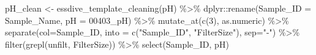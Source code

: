 \documentclass[
]{article}
\newenvironment{Shaded}{\begin{snugshade}}{\end{snugshade}}
\newcommand{\AttributeTok}[1]{\textcolor[rgb]{0.77,0.63,0.00}{#1}}
\newcommand{\DecValTok}[1]{\textcolor[rgb]{0.00,0.00,0.81}{#1}}
\newcommand{\FunctionTok}[1]{\textcolor[rgb]{0.00,0.00,0.00}{#1}}
\newcommand{\NormalTok}[1]{#1}
\newcommand{\OtherTok}[1]{\textcolor[rgb]{0.56,0.35,0.01}{#1}}
\newcommand{\SpecialCharTok}[1]{\textcolor[rgb]{0.00,0.00,0.00}{#1}}
\newcommand{\StringTok}[1]{\textcolor[rgb]{0.31,0.60,0.02}{#1}}
\begin{document}
\begin{Shaded}
\begin{Highlighting}[]
\NormalTok{pH\_clean }\OtherTok{\textless{}{-}} \FunctionTok{essdive\_template\_cleaning}\NormalTok{(pH)  }\SpecialCharTok{\%\textgreater{}\%}
\NormalTok{  dplyr}\SpecialCharTok{::}\FunctionTok{rename}\NormalTok{(}\AttributeTok{Sample\_ID =}\NormalTok{ Sample\_Name,}
                \AttributeTok{pH =} \StringTok{\textquotesingle{}00403\_pH\textquotesingle{}}\NormalTok{) }\SpecialCharTok{\%\textgreater{}\%}
   \FunctionTok{mutate\_at}\NormalTok{(}\FunctionTok{c}\NormalTok{(}\DecValTok{3}\NormalTok{), as.numeric) }\SpecialCharTok{\%\textgreater{}\%}
  \FunctionTok{separate}\NormalTok{(}\AttributeTok{col=}\NormalTok{Sample\_ID, }\AttributeTok{into =} \FunctionTok{c}\NormalTok{(}\StringTok{"Sample\_ID"}\NormalTok{, }\StringTok{"FilterSize"}\NormalTok{), }\AttributeTok{sep=}\StringTok{"{-}"}\NormalTok{)  }\SpecialCharTok{\%\textgreater{}\%}
  \FunctionTok{filter}\NormalTok{(}\FunctionTok{grepl}\NormalTok{(}\StringTok{\textquotesingle{}unfilt\textquotesingle{}}\NormalTok{, FilterSize)) }\SpecialCharTok{\%\textgreater{}\%}
  \FunctionTok{select}\NormalTok{(Sample\_ID, pH)}


\end{Highlighting}
\end{Shaded}
\end{document}
